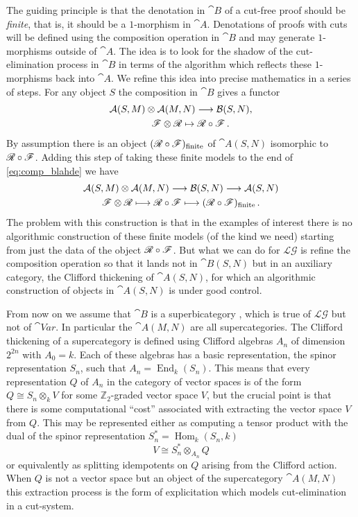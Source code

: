 \documentclass[english,letter paper,12pt,reqno]{article}
\theoremstyle{example}
\numberwithin{equation}{section}
\def\LG{\mathcal{LG}}
\def\Hom{\operatorname{Hom}}
\DeclareMathOperator{\End}{End}
\begin{document}
The guiding principle is that the denotation in $\cat{B}$ of a cut-free proof should be \emph{finite}, that is, it should be a $1$-morphism in $\cat{A}$. Denotations of proofs with cuts will be defined using the composition operation in $\cat{B}$ and may generate $1$-morphisms outside of $\cat{A}$. The idea is to look for the shadow of the cut-elimination process in $\cat{B}$ in terms of the algorithm which reflects these $1$-morphisms back into $\cat{A}$. We refine this idea into precise mathematics in a series of steps. For any object $S$ the composition in $\cat{B}$ gives a functor
\begin{gather}\label{eq:comp_blahde}
\mathcal{A}(S,M) \otimes \mathcal{A}(M,N) \longrightarrow \mathcal{B}(S,N),\\ \qquad \mathscr{F} \otimes \mathscr{R} \mapsto \mathscr{R} \circ \mathscr{F}\,.
\end{gather}
By assumption there is an object $(\mathscr{R} \circ \mathscr{F})_{\operatorname{finite}}$ of $\cat{A}(S,N)$ isomorphic to $\mathscr{R} \circ \mathscr{F}$. Adding this step of taking these finite models to the end of \eqref{eq:comp_blahde} we have
\begin{gather}\label{eq:comp_plus_finite}
\mathcal{A}(S,M) \otimes \mathcal{A}(M,N) \longrightarrow \mathcal{B}(S,N) \longrightarrow \mathcal{A}(S,N)\\
\mathscr{F} \otimes \mathscr{R} \longmapsto \mathscr{R} \circ \mathscr{F} \longmapsto (\mathscr{R} \circ \mathscr{F})_{\operatorname{finite}}\,.
\end{gather}
The problem with this construction is that in the examples of interest there is no algorithmic construction of these finite models (of the kind we need) starting from just the data of the object $\mathscr{R} \circ \mathscr{F}$. But what we can do for $\LG$ is refine the composition operation so that it lands not in $\cat{B}(S,N)$ but in an auxiliary category, the Clifford thickening of $\cat{A}(S,N)$, for which an algorithmic construction of objects in $\cat{A}(S,N)$ is under good control.

From now on we assume that $\cat{B}$ is a superbicategory \cite[\S 2.1]{murfet}, which is true of $\LG$ but not of $\cat{V}ar$. In particular the $\cat{A}(M,N)$ are all supercategories. The Clifford thickening of a supercategory is defined using Clifford algebras $A_n$ of dimension $2^{2n}$ with $A_0 = k$. Each of these algebras has a basic representation, the spinor representation $S_n$, such that $A_n = \End_k(S_n)$. This means that every representation $Q$ of $A_n$ in the category of vector spaces is of the form $Q \cong S_n \otimes_k V$ for some $\mathbb{Z}_2$-graded vector space $V$, but the crucial point is that there is some computational ``cost'' associated with extracting the vector space $V$ from $Q$. This may be represented either as computing a tensor product with the dual of the spinor representation $S_n^* = \Hom_k(S_n,k)$
\begin{equation}\label{eq:extract_V}
V \cong S_n^* \otimes_{A_n} Q
\end{equation}
or equivalently as splitting idempotents on $Q$ arising from the Clifford action. When $Q$ is not a vector space but an object of the supercategory $\cat{A}(M,N)$ this extraction process is the form of explicitation which models cut-elimination in a cut-system.
\end{document}
